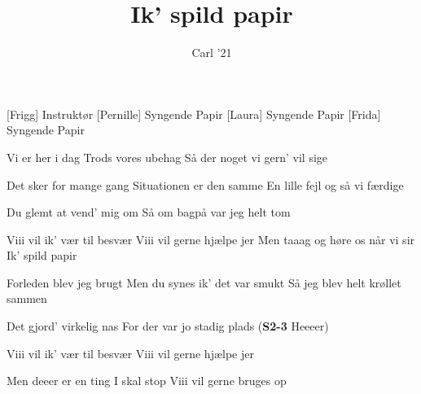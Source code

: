 \documentclass[a4paper,11pt]{article}
\title{Ik' spild papir}
\author{Carl '21}
\begin{document}
\maketitle

\begin{roles}
[Frigg] Instruktør
[Pernille] Syngende Papir
[Laura] Syngende Papir
[Frida] Syngende Papir
\end{roles}

\begin{song}


 Vi er her i dag
        Trods vores ubehag
        Så der noget vi gern' vil sige

 Det sker for mange gang
        Situationen er den samme
        En lille fejl og så vi færdige

 Du glemt at vend' mig om
        Så om bagpå var jeg helt tom

 Viii vil ik' vær til besvær
        Viii vil gerne hjælpe  jer
        Men taaag og høre os når vi sir
        Ik' spild papir

 Forleden blev jeg brugt
        Men du synes ik' det var smukt
        Så jeg blev helt krøllet sammen

 Det gjord' virkelig nas
        For der var jo stadig plads (\textbf{S2-3} Heeeer)

 Viii vil ik' vær til besvær
        Viii vil gerne hjælpe jer

 Men deeer er en ting I skal stop
        Viii vil gerne bruges op
\end{song}
\end{document}
